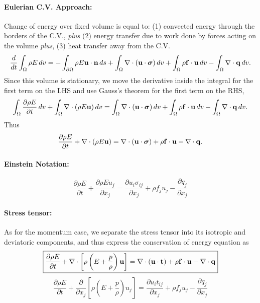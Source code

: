 \documentclass[oneside,a4paper,11pt]{report}
\begin{document}
\paragraph{Eulerian C.V. Approach:}
Change of energy over fixed volume is equal to: (1) convected energy through the borders of the C.V., \textit{plus} (2) energy transfer due to work done by forces acting on the volume \textit{plus}, (3) heat transfer away from the C.V.
\begin{equation}
\frac{d}{dt}\int_\Omega \rho E \,dv=-\int_{\partial \Omega} \rho E \mathbf{u} \cdot \mathbf{n} \, ds + \int_{\Omega} \nabla \cdot (\mathbf{u} \cdot \boldsymbol{\sigma}) \,dv + \int_{\Omega} \rho \mathbf{f} \cdot \mathbf{u} \,dv - \int_{\Omega} \nabla \cdot \mathbf{q} \, dv.
\end{equation}
Since this volume is stationary, we move the derivative inside the integral for the first term on the LHS and use Gauss's theorem for the first term on the RHS,
\begin{equation}
\int_\Omega \frac{\partial \rho E}{\partial t}\,dv + \int_\Omega \nabla \cdot (\rho E \mathbf{u}) \,dv = \int_\Omega \nabla \cdot ( \mathbf{u} \cdot \boldsymbol{\sigma} ) \,dv + \int_\Omega \rho \mathbf{f} \cdot \mathbf{u} \,dv - \int_\Omega \nabla \cdot \mathbf{q}\,dv.
\end{equation}
Thus
\begin{equation}
\frac{\partial \rho E}{\partial t} + \nabla \cdot (\rho E \mathbf{u} ) = \nabla\cdot(\mathbf{u} \cdot \boldsymbol{\sigma}) + \rho \mathbf{f} \cdot \mathbf{u} - \nabla\cdot\mathbf{q}.
\end{equation}

\paragraph{Einstein Notation:}
\begin{equation}
\frac{\partial \rho E}{\partial t} + \frac{\partial \rho E u_j}{\partial x_j} = \frac{\partial u_i\sigma_{ij}}{\partial x_j} + \rho f_j u_j - \frac{\partial q_j}{\partial x_j}
\end{equation}

\paragraph{Stress tensor:}
As for the momentum case, we separate the stress tensor into its isotropic and deviatoric components, and thus express the conservation of energy equation as 
\begin{equation}
\label{eq:energy_conservation_vector}
\boxed{\frac{\partial \rho E}{\partial t} + \nabla \cdot \left [\rho \left ( E  + \frac{p}{\rho} \right ) \mathbf{u} \right] = \nabla\cdot(\mathbf{u} \cdot \mathbf{t} ) + \rho \mathbf{f} \cdot \mathbf{u} - \nabla \cdot \mathbf{q}}
\end{equation}
\begin{equation}
\label{eq:energy_conservation_tensor}
\boxed{\frac{\partial \rho E}{\partial t} + \frac{\partial}{\partial x_j} \left [ \rho \left ( E + \frac{p}{\rho} \right ) u_j \right ] = \frac{\partial u_i t_{ij}}{\partial x_j} + \rho f_j u_j - \frac{\partial q_j}{\partial x_j}}
\end{equation}
\end{document}
